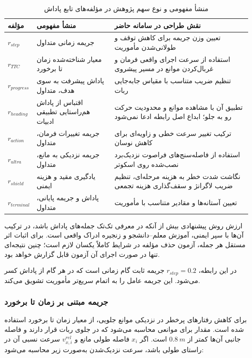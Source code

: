 \begin{table}[htbp]
\centering
\small
\caption{منشأ مفهومی و نوع سهم پژوهش در مؤلفه‌های تابع پاداش}
\label{tab:reward_component_provenance}
\begin{tabular}{|p{2.15cm}|p{4.5cm}|p{7cm}|}
\hline
مؤلفه & منشأ مفهومی & نقش طراحی در سامانه حاضر \\
\hline
\(r_{step}\) & جریمه زمانی متداول & تعیین وزن جریمه برای کاهش توقف و طولانی‌شدن مأموریت \\
\hline
\(r_{TTC}\) & معیار شناخته‌شده زمان تا برخورد & استفاده از سرعت اجرای واقعی فرمان و غربال‌کردن موانع در مسیر پیشروی \\
\hline
\(r_{progress}\) & پاداش پیشرفت به سوی هدف، متداول & تنظیم ضریب متناسب با مقیاس جابه‌جایی ربات \\
\hline
\(r_{heading}\) & اقتباس از پاداش هم‌راستایی تطبیقی ادبیات & تطبیق آن با مشاهده موانع و محدودیت حرکت رو به جلو؛ ابداع اصل رابطه ادعا نمی‌شود \\
\hline
\(r_{action}\) & جریمه تغییرات فرمان، متداول & ترکیب تغییر سرعت خطی و زاویه‌ای برای کاهش نوسان \\
\hline
\(r_{ultra}\) & جریمه نزدیکی به مانع، متداول & استفاده از فاصله‌سنج‌های فراصوت نزدیک‌برد نصب‌شده روی اسکوتر \\
\hline
\(r_{shield}\) & یادگیری مقید و هزینه ایمنی & نگاشت شدت خطر به هزینه مرحله‌ای، تنظیم ضریب لاگرانژ و سقف‌گذاری هزینه تجمعی \\
\hline
\(r_{terminal}\) & پاداش و جریمه پایانی، متداول & تعیین آستانه‌ها و مقادیر متناسب با مأموریت \\
\hline
\end{tabular}
\end{table}

ارزش روش پیشنهادی بیش از آنکه در معرفی تک‌تک جمله‌های پاداش باشد، در ترکیب آن‌ها با سپر ایمنی، آموزش معلم--دانشجو و زنجیره ادراک واقعی است. برای اثبات اثر مستقل هر جمله، آزمون حذف مؤلفه در شرایط کاملاً یکسان لازم است؛ چنین نتیجه‌ای تنها در صورت اجرای آن آزمون قابل گزارش خواهد بود.

در این رابطه، \(r_{step}=0.2\) جریمه ثابت گام زمانی است که در هر گام از پاداش کسر می‌شود. این جریمه عامل را به اتمام سریع‌تر مأموریت تشویق می‌کند.

\subsubsection{جریمه مبتنی بر زمان تا برخورد}
\label{subsubsec:ttc_reward_final}

برای کاهش رفتارهای پرخطر در نزدیکی موانع جلویی، از معیار زمان تا برخورد%
 استفاده شده است. مقدار  برای موانعی محاسبه می‌شود که در جلوی ربات قرار دارند و فاصله جانبی آن‌ها کمتر از \(0.8~m\) است. اگر \(x_i\) فاصله طولی مانع و \(v^{rel}_{x,i}\) سرعت نسبی آن در راستای طولی باشد، سرعت نزدیک‌شدن به‌صورت زیر محاسبه می‌شود:

